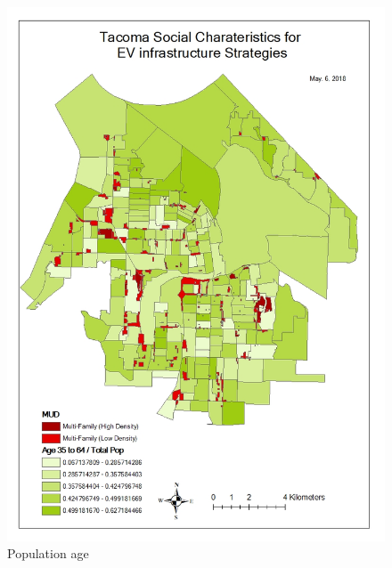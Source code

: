 \documentclass[]{article}
\begin{document}
\begin{figure}
\centering
\includegraphics{./figs/age.jpg}
\caption{Population age}
\end{figure}
\end{document}
